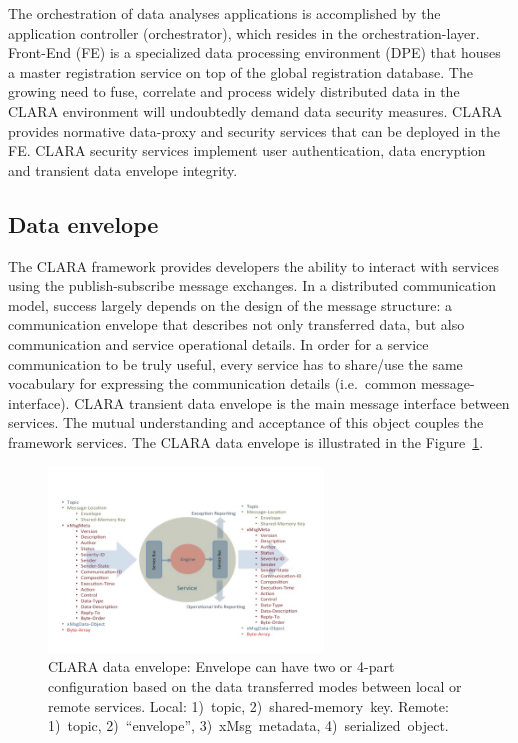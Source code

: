 \documentclass[a4paper]{jpconf}
\begin{document}
The orchestration of data analyses applications is accomplished by the
application controller (orchestrator), which resides in the
orchestration-layer.
Front-End (FE) is a specialized data processing environment (DPE) that houses
a master registration service on top of the global registration database.
The growing need to fuse, correlate and process widely distributed data in the
CLARA environment will undoubtedly demand data security measures.
CLARA provides normative data-proxy and security services
that can be deployed in the FE.
CLARA security services implement user authentication, data encryption and
transient data envelope integrity.

\subsection{Data envelope}

The CLARA framework provides developers
the ability to interact with services
using the publish-subscribe message exchanges.
In a distributed communication model,
success largely depends on the design of the message structure:
a communication envelope that describes not only transferred data,
but also communication and service operational details.
In order for a service communication to be truly useful,
every service has to share/use the same vocabulary
for expressing the communication details (i.e.~common message-interface).
CLARA transient data envelope is the main message interface between services.
The mutual understanding and acceptance of this object
couples the framework services.
The CLARA data envelope is illustrated in the Figure~\ref{fig:msg}.

\begin{figure}[!h]
  \begin{center}
    \includegraphics[width=0.65\textwidth]{figures/msg}
  \end{center}
  \caption{CLARA data envelope:
    Envelope can have two or 4-part configuration
    based on the data transferred modes between local or remote services.
    Local: 1)~topic, 2)~shared-memory~key.
    Remote: 1)~topic, 2)~``envelope'', 3)~xMsg~metadata, 4)~serialized~object.}
  \label{fig:msg}
\end{figure}
\end{document}
